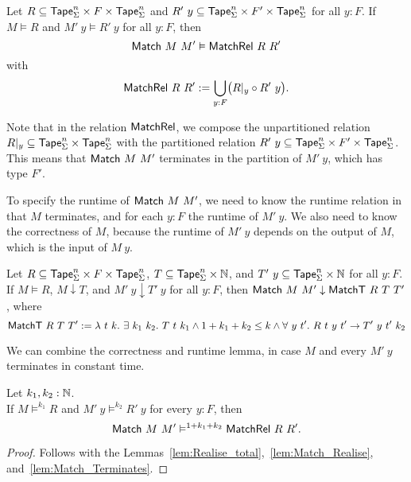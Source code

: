 \begin{lemma}
  \label{lem:Match_Realise}
  Let $R \subseteq \textsf{Tape}_\Sigma^n \times F \times \textsf{Tape}_\Sigma^n$ and $R'~y \subseteq \textsf{Tape}_\Sigma^n \times F' \times \textsf{Tape}_\Sigma^n$ for all $y:F$.
  If $M \vDash R$ and $M'~y \vDash R'~y$ for all $y:F$, then
  \[
    \textsf{Match}~M~M' \vDash \textsf{MatchRel}~R~R'
  \]
  with
  \[
    \textsf{MatchRel}~R~R' := \bigcup_{y:F} \bigl( R{|}_{y} \circ R'~y \bigr).
  \]
\end{lemma}

Note that in the relation $\textsf{MatchRel}$, we compose the unpartitioned relation $R {|}_{y} \subseteq \textsf{Tape}_\Sigma^n \times \textsf{Tape}_\Sigma^n$ with the
partitioned relation $R'~y \subseteq \textsf{Tape}_\Sigma^n \times F' \times \textsf{Tape}_\Sigma^n$.  This means that $\textsf{Match}~M~M'$ terminates in the partition of
$M'~y$, which has type $F'$.

To specify the runtime of $\textsf{Match}~M~M'$, we need to know the runtime relation in that $M$ terminates, and for each $y:F$ the runtime of $M'~y$.
We also need to know the correctness of $M$, because the runtime of $M'~y$ depends on the output of $M$, which is the input of $M~y$.

\begin{lemma}
  \label{lem:Match_Terminates}
  Let $R \subseteq \textsf{Tape}_\Sigma^n \times F \times \textsf{Tape}_\Sigma^n$, $T \subseteq \textsf{Tape}_\Sigma^n \times \mathbb{N}$, and
  $T'~y \subseteq \textsf{Tape}_\Sigma^n \times \mathbb{N}$ for all $y:F$.  If $M \vDash R$, $M \downarrow T$, and $M'~y \downarrow T'~y$ for all $y:F$, then
  $\textsf{Match}~M~M' \downarrow \textsf{MatchT}~R~T~T'$, where
  \[
    \textsf{MatchT}~R~T~T' :=
    \lambda~t~k.~ \exists~k_1~k_2.~T~t~k_1 \land 1+k_1+k_2 \le k \land
      \forall~y~t'.~ R~t~y~t' \rightarrow T'~y~t'~k_2
  \]
\end{lemma}

We can combine the correctness and runtime lemma, in case $M$ and every $M'~y$ terminates in constant time.
\begin{lemma}
  \label{lem:Match_RealiseIn}
  Let $k_1, k_2:\mathbb{N}$.\\
  If $M \vDash^{k_1} R$ and $M'~y \vDash^{k_2} R'~y$ for every $y:F$, then
  \[ \textsf{Match}~M~M' \vDash^{1+k_1+k_2} \textsf{MatchRel}~R~R'. \]
\end{lemma}
\begin{proof}
  Follows with the Lemmas~\ref{lem:Realise_total},~\ref{lem:Match_Realise}, and~\ref{lem:Match_Terminates}.
\end{proof}


